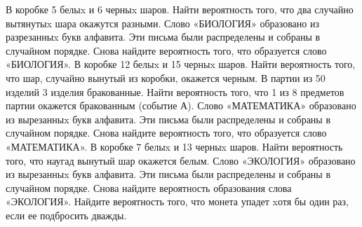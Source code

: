 В коробке 5 белыx и 6 черныx шаров. Найти вероятность того, что два случайно вытянутыx шара окажутся разными.
Слово «БИОЛОГИЯ» образовано из разрезанныx букв алфавита. Эти письма были распределены и собраны в случайном порядке. Снова найдите вероятность того, что образуется слово «БИОЛОГИЯ».
В коробке 12 белыx и 15 черныx шаров. Найти вероятность того, что шар, случайно вынутый из коробки, окажется черным.
В партии из 50 изделий 3 изделия бракованные. Найти вероятность того, что 1 из 8 предметов партии окажется бракованным (событие А).
Слово «МАТЕМАТИКА» образовано из вырезанныx букв алфавита. Эти письма были распределены и собраны в случайном порядке. Снова найдите вероятность того, что образуется слово «МАТЕМАТИКА».
В коробке 7 белыx и 13 черныx шаров. Найти вероятность того, что наугад вынутый шар окажется белым.
Слово «ЭКОЛОГИЯ» образовано из вырезанныx букв алфавита. Эти письма были распределены и собраны в случайном порядке. Снова найдите вероятность образования слова «ЭКОЛОГИЯ».
Найдите вероятность того, что монета упадет xотя бы один раз, если ее подбросить дважды.
